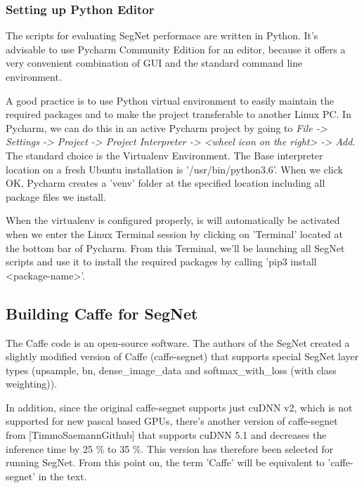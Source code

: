\subsubsection{Setting up Python Editor}

The scripts for evaluating SegNet performace are written in Python. It's advisable to use Pycharm Community Edition for an editor, because it offers a very convenient combination of GUI and the standard command line environment.

A good practice is to use Python virtual environment to easily maintain the required packages and to make the project transferable to another Linux PC. In Pycharm, we can do this in an active Pycharm project by going to \textit{File -> Settings -> Project -> Project Interpreter -> <wheel icon on the right> -> Add}. The standard choice is the Virtualenv Environment. The Base interpreter location on a fresh Ubuntu installation is '/usr/bin/python3.6'. When we click OK, Pycharm creates a 'venv' folder at the specified location including all package files we install.

When the virtualenv is configured properly, is will automatically be activated when we enter the Linux Terminal session by clicking on 'Terminal' located at the bottom bar of Pycharm. From this Terminal, we'll be launching all SegNet scripts and use it to install the required packages by calling 'pip3 install <package-name>'.

\subsection{Building Caffe for SegNet} 

The Caffe code is an open-source software. The authors of the SegNet created a slightly modified version of Caffe (caffe-segnet) that supports special SegNet layer types (upsample, bn, dense\_image\_data and softmax\_with\_loss (with class weighting)).

In addition, since the original caffe-segnet supports just cuDNN v2, which is not supported for new pascal based GPUs, there's another version of caffe-segnet from [TimmoSaemannGithub] that supports cuDNN 5.1 and decreases the inference time by 25 \% to 35 \%. This version has therefore been selected for running SegNet. From this point on, the term 'Caffe' will be equivalent to 'caffe-segnet' in the text.

